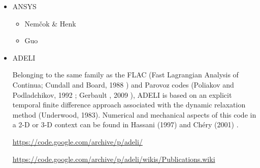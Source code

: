 \begin{itemize}
\item {\codefont ANSYS} 

\begin{scriptsize}
\begin{itemize}
\item Nem{\v{c}}ok \& Henk \cite{nehe06}
\item Guo \etal \cite{guyr16}
\end{itemize}
\end{scriptsize}

\item {\codefont ADELI} 

Belonging to the same family as the FLAC 
(Fast Lagrangian Analysis of Continua; Cundall and Board, 1988 \cite{cubo88}) 
and Parovoz codes 
(Poliakov and Podladchikov, 1992 \cite{popo92}; Gerbault \etal, 2009 \cite{gecm09}), 
ADELI is based on an explicit temporal
finite difference approach associated with the dynamic relaxation method (Underwood, 1983). 
Numerical and mechanical aspects of this code in a 2-D or 3-D context can be 
found in Hassani \etal (1997) \cite{hajc97} and Ch\'ery \etal (2001) \cite{chzh01}.

\url{https://code.google.com/archive/p/adeli/}

\url{https://code.google.com/archive/p/adeli/wikis/Publications.wiki}


\end{itemize}
